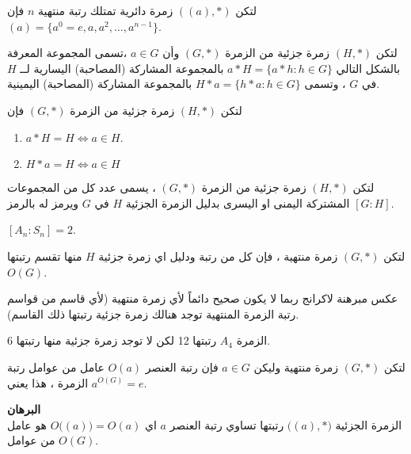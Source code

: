  \begin{theorem}
 	لتكن $((a), *)$ زمرة دائرية تمتلك رتبة منتهية $n$ فإن 
 	$(a) = \{a^0 = e, a, a^2, \dots, a^{n-1}\}$.
 \end{theorem}
 
 
 
 \begin{definition}
 	لتكن $(H, *)$ زمرة جزئية من الزمرة $(G, *)$ وأن $a\in G$ ،تسمى  المجموعة المعرفة بالشكل التالي 
 	$a* H = \{a * h : h\in G\}$
 	بالمجموعة المشاركة (المصاحبة)  اليسارية لــ $H$ في $G$  ، وتسمى $H*a = \{h*a:h\in G\}$ بالمجموعة المشاركة (المصاحبة) اليمينية.  
 \end{definition}
 
 
 \begin{theorem}
 	لتكن $(H, *)$ زمرة جزئية من الزمرة $(G, *)$ فإن
 	\begin{enumerate}
 		\item $a*H=H \iff a\in H$.
 		\item $H*a = H \iff a\in H$
 	\end{enumerate}
 \end{theorem}
 
 \begin{definition}
 	لتكن $(H, *)$ زمرة جزئية من الزمرة $(G, *)$ ، يسمى عدد كل من المجموعات المشتركة اليمنى او  اليسرى بدليل الزمرة الجزئية $H$ في $G$ ويرمز له بالرمز $[G:H]$.
 \end{definition}
 \begin{example}
 	$[A_n : S_n] = 2$.
 \end{example}
 
 \begin{theorem}
 	لتكن $(G, *)$ زمرة منتهية ، فإن كل من رتبة ودليل اي زمرة جزئية $H$ منها تقسم رتبتها $O(G)$. 
 \end{theorem}
 
 \begin{note}
 	عكس مبرهنة لاكرانج ربما لا يكون صحيح دائماً لأي زمرة منتهية (لأي قاسم من قواسم رتبة الزمرة المنتهية توجد هنالك زمرة جزئية رتبتها ذلك القاسم).
 \end{note}
 
 \begin{example}
 	الزمرة $A_4$ رتبتها 12 لكن لا توجد زمرة جزئية منها رتبتها 6.
 \end{example}
 
 \begin{corollary}
 	لتكن $(G, *) $ زمرة منتهية وليكن $a\in G$ فإن رتبة العنصر $O(a)$ عامل من عوامل رتبة الزمرة ، هذا يعني $a^{O(G)} =e$.
 \end{corollary}
 \noindent
 \textbf{البرهان}\\
 \noindent
 الزمرة الجزئية $\big((a), *\big)$ رتبتها تساوي رتبة العنصر $a$ اي
 $O\big((a)\big) = O(a)$
 هو عامل من عوامل $O(G)$.
 
